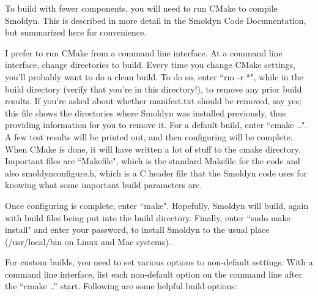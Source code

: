 \documentclass {book}
\begin{document}
To build with fewer components, you will need to run CMake to compile Smoldyn. This is described in more detail in the Smoldyn Code Documentation, but summarized here for convenience.

I prefer to run CMake from a command line interface. At a command line interface, change directories to build. Every time you change CMake settings, you'll probably want to do a clean build. To do so, enter ``rm -r *", while in the build directory (verify that you're in this directory!), to remove any prior build results. If you're asked about whether manifest.txt should be removed, say yes; this file shows the directories where Smoldyn was installed previously, thus providing information for you to remove it. For a default build, enter ``cmake ..". A few test results will be printed out, and then configuring will be complete. When CMake is done, it will have written a lot of stuff to the cmake directory. Important files are ``Makefile", which is the standard Makefile for the code and also smoldynconfigure.h, which is a C header file that the Smoldyn code uses for knowing what some important build parameters are.

Once configuring is complete, enter ``make". Hopefully, Smoldyn will build, again with build files being put into the build directory. Finally, enter ``sudo make install" and enter your password, to install Smoldyn to the usual place (/usr/local/bin on Linux and Mac systems).

For custom builds, you need to set various options to non-default settings. With a command line interface, list each non-default option on the command line after the ``cmake ..'' start. Following are some helpful build options:
\end{document}
